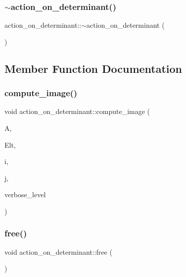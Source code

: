 \subsubsection{\texorpdfstring{$\sim$action\+\_\+on\+\_\+determinant()}{~action\_on\_determinant()}}
{\footnotesize\ttfamily action\+\_\+on\+\_\+determinant\+::$\sim$action\+\_\+on\+\_\+determinant (\begin{DoxyParamCaption}{ }\end{DoxyParamCaption})}



\subsection{Member Function Documentation}
\mbox{\label{classaction__on__determinant_afc50562cf0aa95e81eb0062749dc3940}} 
\subsubsection{\texorpdfstring{compute\+\_\+image()}{compute\_image()}}
{\footnotesize\ttfamily void action\+\_\+on\+\_\+determinant\+::compute\+\_\+image (\begin{DoxyParamCaption}\item[{\mbox{\hyperlink{classaction}{action}} $\ast$}]{A,  }\item[{\mbox{\hyperlink{galois_8h_a09fddde158a3a20bd2dcadb609de11dc}{I\+NT}} $\ast$}]{Elt,  }\item[{\mbox{\hyperlink{galois_8h_a09fddde158a3a20bd2dcadb609de11dc}{I\+NT}}}]{i,  }\item[{\mbox{\hyperlink{galois_8h_a09fddde158a3a20bd2dcadb609de11dc}{I\+NT}} \&}]{j,  }\item[{\mbox{\hyperlink{galois_8h_a09fddde158a3a20bd2dcadb609de11dc}{I\+NT}}}]{verbose\+\_\+level }\end{DoxyParamCaption})}

\mbox{\label{classaction__on__determinant_a944af69537b20b45c90a4740bb105d8d}} 
\subsubsection{\texorpdfstring{free()}{free()}}
{\footnotesize\ttfamily void action\+\_\+on\+\_\+determinant\+::free (\begin{DoxyParamCaption}{ }\end{DoxyParamCaption})}

